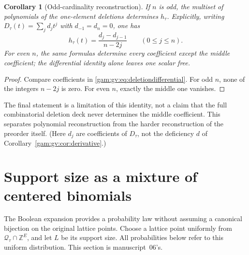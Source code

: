\documentclass[11pt]{article}
\numberwithin{equation}{section}
\newtheorem{corollary}[theorem]{Corollary}
\theoremstyle{definition}
\newcommand{\Z}{\mathbb Z}
\newcommand{\Qt}{\mathcal Q_\tau}
\begin{document}
\begin{corollary}[Odd-cardinality reconstruction]\label{gam:gv:cor:odddeck}
If $n$ is odd, the multiset of polynomials of the one-element deletions
determines $h_\tau$. Explicitly, writing $D_\tau(t)=\sum_j d_jt^j$ with
$d_{-1}=d_n=0$, one has
\begin{equation}
 [t^j]h_\tau(t)=\frac{d_j-d_{j-1}}{n-2j}
                                      \qquad(0\le j\le n).
 \label{gam:gv:eq:oddreconstruction}
\end{equation}
For even $n$, the same formulas determine every coefficient except the
middle coefficient; the differential identity alone leaves one scalar free.
\end{corollary}
\begin{proof}
Compare coefficients in \eqref{gam:gv:eq:deletiondifferential}. For odd $n$, none
of the integers $n-2j$ is zero. For even $n$, exactly the middle one vanishes.
\end{proof}
The final statement is a limitation of this identity, not a claim that the
full combinatorial deletion deck never determines the middle coefficient.
This separates polynomial reconstruction from the harder reconstruction of
the preorder itself. (Here $d_j$ are coefficients of $D_\tau$, not the
deficiency $d$ of Corollary~\ref{gam:gv:cor:derivative}.)

\section{Support size as a mixture of centered binomials}\label{gam:sec:statistics}
The Boolean expansion provides a probability law without assuming a
canonical bijection on the original lattice points. Choose a lattice point
uniformly from $\Qt\cap\Z^E$, and let $L$ be its support size. All
probabilities below refer to this uniform distribution. This section is
manuscript~06's.
\end{document}
